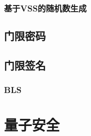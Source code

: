 \documentclass[UTF8]{ctexart}
\begin{document}
\subsubsection{基于VSS的随机数生成}

\subsection{门限密码}

\subsection{门限签名}

\subsubsection{BLS}

\section{量子安全}

\ifx\allfiles\undefined
\end{document}
